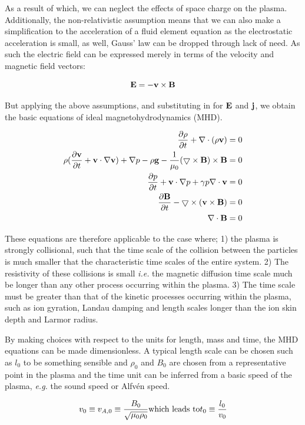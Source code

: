 As a result of which, we can neglect the effects of space charge on the plasma.
Additionally, the non-relativistic assumption means that we can also make a simplification to the acceleration of a fluid element equation as the electrostatic acceleration is small, as well, Gauss' law can be dropped through lack of need.
As such the electric field can be expressed merely in terms of the velocity and magnetic field vectors:

\begin{equation}
	\mathbf{E} = -\mathbf{v} \times \mathbf{B}
\end{equation}

But applying the above assumptions, and substituting in for $\mathbf{E}$ and $\mathbf{j}$, we obtain the basic equations of ideal magnetohydrodynamics (MHD).

\begin{align}
	\frac{\partial \rho}{\partial t } + \nabla\cdot(\rho\mathbf{v}) &= 0 \\
	\rho(\frac{\partial \mathbf{v}}{\partial t } + \mathbf{v}\cdot\nabla\mathbf{v}) + \nabla p - \rho\mathbf{g} - \frac{1}{\mu_0}(\bigtriangledown \times \mathbf{B}) \times \mathbf{B} &= 0\\
	\frac{\partial p}{\partial t } + \mathbf{v}\cdot\nabla p + \gamma p\nabla\cdot\mathbf{v} &= 0\\
	\frac{\partial \mathbf{B}}{\partial t } - \bigtriangledown \times (\mathbf{v} \times \mathbf{B}) &= 0\\
	\nabla\cdot\mathbf{B} &= 0
\end{align}

\noindent These equations are therefore applicable to the case where; 1) the plasma is strongly collisional, such that the time scale of the collision between the particles is much smaller that the characteristic time scales of the entire system.
2) The resistivity of these collisions is small \emph{i.e.} the magnetic diffusion time scale much be longer than any other process occurring within the plasma.
3) The time scale must be greater than that of the kinetic processes occurring within the plasma, such as ion gyration, Landau damping and length scales longer than the ion skin depth and Larmor radius.

By making choices with respect to the units for length, mass and time, the MHD equations can be made dimensionless.
A typical length scale can be chosen such as $l_0$ to be something sensible and $\rho_0$ and $B_0$ are chosen from a representative point in the plasma and the time unit can be inferred from a basic speed of the plasma, \emph{e.g.} the sound speed or Alfv{\'e}n speed.

\begin{equation}
	v_0 \equiv v_{A,0} \equiv \frac{B_0}{\sqrt{\mu_0\rho_0}} \textnormal{which leads to} t_0 \equiv \frac{l_0}{v_0} 
\end{equation}

